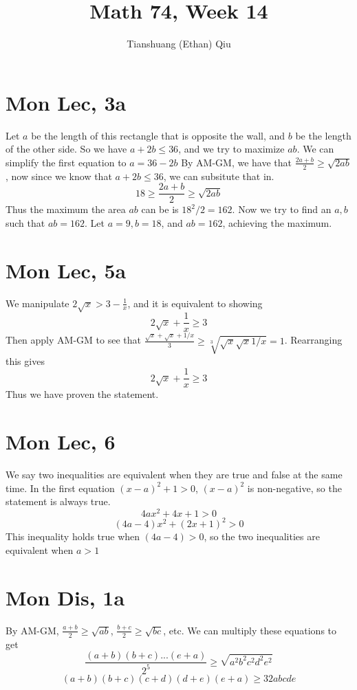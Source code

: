 \documentclass[12pt]{article}
\author{Tianshuang (Ethan) Qiu}
\begin{document}
\title{Math 74, Week 14}
\maketitle


\section{Mon Lec, 3a}
Let $a$ be the length of this rectangle that is opposite the wall, and $b$ be the length of the other side. So we have $a+2b \leq 36$, and we try to maximize $ab$. We can simplify the first equation to $a = 36 - 2b$
\newline
By AM-GM, we have that $\frac{2a+b}{2} \geq \sqrt{2ab}$, now since we know that $a+2b \leq 36$, we can subsitute that in.
$$18 \geq \frac{2a+b}{2} \geq \sqrt{2ab}$$
Thus the maximum the area $ab$ can be is $18^2/2 = 162$. Now we try to find an $a,b$ such that $ab = 162$.
Let $a = 9, b = 18$, and $ab=162$, achieving the maximum.

\section{Mon Lec, 5a}
We manipulate $2 \sqrt x > 3 - \frac{1}{x}$, and it is equivalent to showing
$$2 \sqrt{x} + \frac{1}{x} \geq 3$$
Then apply AM-GM to see that $\frac{\sqrt{x}+\sqrt{x}+1/x}{3} \geq
\sqrt[3]{\sqrt{x}\sqrt{x}1/x} = 1$. Rearranging this gives
$$2 \sqrt{x} + \frac{1}{x} \geq 3$$
Thus we have proven the statement.


\section{Mon Lec, 6}
We say two inequalities are equivalent when they are true and false at the same time.
\newline
In the first equation $(x-a)^2+1>0$, $(x-a)^2$ is non-negative, so the statement is always true.
$$4ax^2 + 4x + 1 > 0$$
$$(4a-4)x^2 + (2x+1)^2 > 0$$
This inequality holds true when $(4a-4)>0$, so the two inequalities are equivalent when $a > 1$
\newpage


\section{Mon Dis, 1a}
By AM-GM, $\frac{a+b}{2} \geq \sqrt{ab}$, $\frac{b+c}{2} \geq \sqrt{bc}$, etc.
\newline
We can multiply these equations to get
$$\frac{(a+b)(b+c)...(e+a)}{2^5} \geq \sqrt{a^2b^2c^2d^2e^2}$$
$$(a+b)(b+c)(c+d)(d+e)(e+a) \geq 32abcde$$
\end{document}
